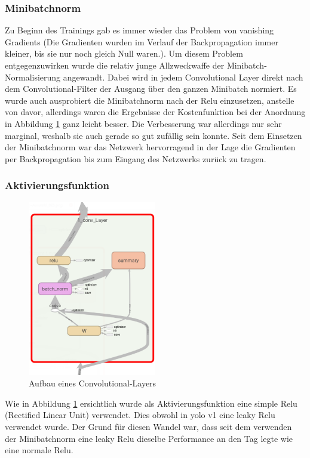 \subsubsection{Minibatchnorm}
Zu Beginn des Trainings gab es immer wieder das Problem von vanishing Gradients (Die Gradienten wurden im Verlauf der Backpropagation immer kleiner, bis sie nur noch gleich Null waren.).
Um diesem Problem entgegenzuwirken wurde die relativ junge Allzweckwaffe der Minibatch-Normalisierung angewandt.
Dabei wird in jedem Convolutional Layer direkt nach dem Convolutional-Filter der Ausgang über den ganzen Minibatch normiert.
Es wurde auch ausprobiert die Minibatchnorm nach der Relu einzusetzen, anstelle von davor, allerdings waren die Ergebnisse der Kostenfunktion bei der Anordnung in Abbildung \ref{img:Conv-Layer} ganz leicht besser.
Die Verbesserung war allerdings nur sehr marginal, weshalb sie auch gerade so gut zufällig sein konnte.
Seit dem Einsetzen der Minibatchnorm war das Netzwerk hervorragend in der Lage die Gradienten per Backpropagation bis zum Eingang des Netzwerks zurück zu tragen. 

\subsubsection{Aktivierungsfunktion}
\begin{figure}
	\centering	
	\includegraphics[width=0.5\textwidth]{Kapitel/40Architektur/Bilder/GraphProLayer.pdf}
	\caption{Aufbau eines Convolutional-Layers}
	\label{img:Conv-Layer}
\end{figure}

Wie in Abbildung \ref{img:Conv-Layer} ersichtlich wurde als Aktivierungsfunktion eine simple Relu (Rectified Linear Unit) verwendet. Dies obwohl in yolo v1 eine leaky Relu verwendet wurde.
Der Grund für diesen Wandel war, dass seit dem verwenden der Minibatchnorm eine leaky Relu dieselbe Performance an den Tag legte wie eine normale Relu.

